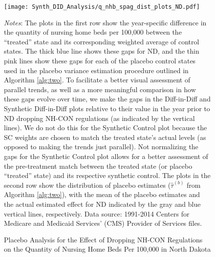 \documentclass[../Main.tex]{subfiles}
\begin{document}
\newpage
\begin{figure}[t]
	\begin{center}
	\caption{\label{fig: q_nhb_spag_plots_nd} \centering Placebo Analysis for the Effect of Dropping NH-CON Regulations on the Quantity of Nursing Home Beds Per 100,000 in North Dakota}
    \texttt{[image: Synth\_DID\_Analysis/q\_nhb\_spag\_dist\_plots\_ND.pdf]}
    \end{center}
    \footnotesize
		\textit{Notes}: The plots in the first row show the year-specific difference in the quantity of nursing home beds per 100,000 between the ``treated'' state and its corresponding weighted average of control states. The thick blue line shows these gaps for ND, and the thin pink lines show these gaps for each of the placebo control states used in the placebo variance estimation procedure outlined in Algorithm \ref{alg:two}. To facilitate a better visual assessment of parallel trends, as well as a more meaningful comparison in how these gaps evolve over time, we make the gaps in the Diff-in-Diff and Synthetic Diff-in-Diff plots relative to their value in the year prior to ND dropping NH-CON regulations (as indicated by the vertical lines). We do not do this for the Synthetic Control plot because the SC weights are chosen to match the treated state's actual levels (as opposed to making the trends just parallel). Not normalizing the gaps for the Synthetic Control plot allows for a better assessment of the pre-treatment match between the treated state (or placebo ``treated'' state) and its respective synthetic control. The plots in the second row show the distribution of placebo estimates ($\hat{\tau}^{(b)}$ from Algorithm \ref{alg:two}), with the mean of the placebo estimates and the actual estimated effect for ND indicated by the gray and blue vertical lines, respectively. Data source: 1991-2014 Centers for Medicare and Medicaid Services’ (CMS) Provider of Services files.
\end{figure}
\clearpage



\end{document}
